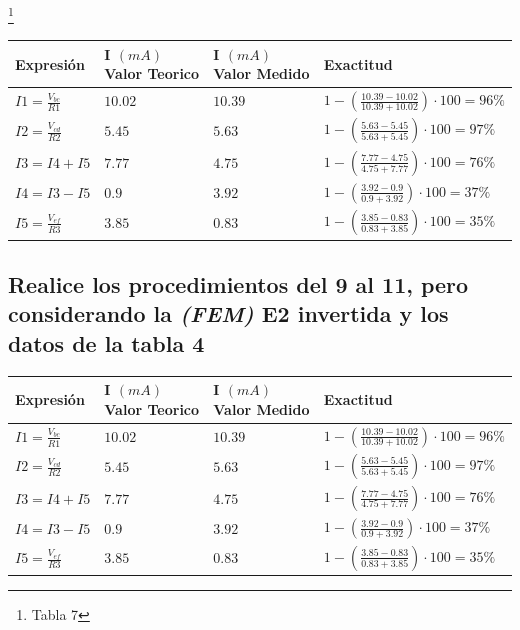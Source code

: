 \documentclass[letterpaper, 12pt]{article}
\begin{document}
\footnote{Tabla 7}
\begin{tabularx}{0.9\linewidth}{|>{\centering\arraybackslash}X|>{\centering\arraybackslash}X|>{\centering\arraybackslash}X|>{\centering\arraybackslash}X|}
	\hline
	Expresión                & I $(mA)$ Valor Teorico & I $(mA)$ Valor Medido & Exactitud                                                    \\\hline
	$I1 = \frac{V_{bc}}{R1}$ & $10.02$                & $10.39$               & $1 - (\frac{10.39 - 10.02}{10.39 + 10.02}) \cdot 100 = 96\%$ \\ \hline
	$I2 = \frac{V_{cd}}{R2}$ & $5.45$                 & $5.63$                & $1 - (\frac{5.63 - 5.45}{5.63 + 5.45}) \cdot 100 = 97\%$     \\ \hline
	$I3 = I4 + I5$           & $7.77$                 & $4.75$                & $1 - (\frac{7.77 - 4.75}{4.75 + 7.77}) \cdot 100 = 76\%$     \\ \hline
	$I4 = I3 - I5$           & $0.9$                  & $3.92$                & $1 - (\frac{3.92 - 0.9}{0.9 + 3.92}) \cdot 100 = 37\%$       \\ \hline
	$I5 = \frac{V_{ef}}{R3}$ & $3.85$                 & $0.83$                & $1 - (\frac{3.85 - 0.83}{0.83 + 3.85}) \cdot 100 = 35\%$     \\\hline
\end{tabularx}

\subsection{Realice los procedimientos del 9 al 11, pero considerando la \textit{(FEM)} E2 invertida y los datos de la tabla 4}

\begin{tabularx}{0.9\linewidth}{|>{\centering\arraybackslash}X|>{\centering\arraybackslash}X|>{\centering\arraybackslash}X|>{\centering\arraybackslash}X|}
	\hline
	Expresión                & I $(mA)$ Valor Teorico & I $(mA)$ Valor Medido & Exactitud                                                    \\\hline
	$I1 = \frac{V_{bc}}{R1}$ & $10.02$                & $10.39$               & $1 - (\frac{10.39 - 10.02}{10.39 + 10.02}) \cdot 100 = 96\%$ \\ \hline
	$I2 = \frac{V_{cd}}{R2}$ & $5.45$                 & $5.63$                & $1 - (\frac{5.63 - 5.45}{5.63 + 5.45}) \cdot 100 = 97\%$     \\ \hline
	$I3 = I4 + I5$           & $7.77$                 & $4.75$                & $1 - (\frac{7.77 - 4.75}{4.75 + 7.77}) \cdot 100 = 76\%$     \\ \hline
	$I4 = I3 - I5$           & $0.9$                  & $3.92$                & $1 - (\frac{3.92 - 0.9}{0.9 + 3.92}) \cdot 100 = 37\%$       \\ \hline
	$I5 = \frac{V_{ef}}{R3}$ & $3.85$                 & $0.83$                & $1 - (\frac{3.85 - 0.83}{0.83 + 3.85}) \cdot 100 = 35\%$     \\\hline
\end{tabularx}
\end{document}
